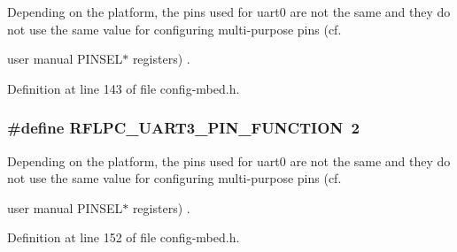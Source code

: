 Depending on the platform, the pins used for uart0 are not the same and they do not use the same value for configuring multi-\/purpose pins (cf. 

user manual P\-I\-N\-S\-E\-L$\ast$ registers) . 

Definition at line 143 of file config-\/mbed.\-h.

\hypertarget{group__config_ga96ec09a4733c111eb037839112f7ae3a}{
\subsubsection[{R\-F\-L\-P\-C\-\_\-\-U\-A\-R\-T3\-\_\-\-P\-I\-N\-\_\-\-F\-U\-N\-C\-T\-I\-O\-N}]{\setlength{\rightskip}{0pt plus 5cm}\#define {\bf R\-F\-L\-P\-C\-\_\-\-U\-A\-R\-T3\-\_\-\-P\-I\-N\-\_\-\-F\-U\-N\-C\-T\-I\-O\-N}~2}}\label{group__config_ga96ec09a4733c111eb037839112f7ae3a}


Depending on the platform, the pins used for uart0 are not the same and they do not use the same value for configuring multi-\/purpose pins (cf. 

user manual P\-I\-N\-S\-E\-L$\ast$ registers) . 

Definition at line 152 of file config-\/mbed.\-h.

